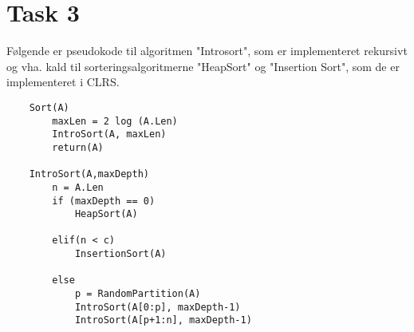 \section{Task 3}

Følgende er pseudokode til algoritmen "Introsort",
som er implementeret rekursivt og vha. kald til sorteringsalgoritmerne "HeapSort" og "Insertion Sort", som de er implementeret i CLRS. 

\begin{verbatim}
    Sort(A)
        maxLen = 2 log (A.Len)
        IntroSort(A, maxLen)
        return(A)
	
    IntroSort(A,maxDepth)
        n = A.Len
        if (maxDepth == 0)
            HeapSort(A)
				
        elif(n < c)
            InsertionSort(A)
		
        else
            p = RandomPartition(A)
            IntroSort(A[0:p], maxDepth-1)
            IntroSort(A[p+1:n], maxDepth-1)
\end{verbatim}
